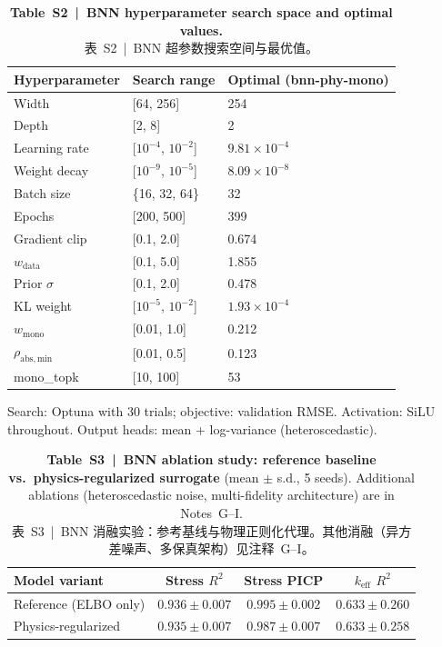 \documentclass[11pt,a4paper]{article}
\newcommand{\keff}{\ensuremath{k_{\mathrm{eff}}}}
\begin{document}
\begin{table}[htbp]
\centering
\caption{\textbf{Table~S2~|~BNN hyperparameter search space and optimal
values.}\\
\small 表~S2~|~BNN 超参数搜索空间与最优值。}
\label{tab:S2}
\smallskip
\small
\begin{tabular}{lll}
\toprule
Hyperparameter & Search range & Optimal (bnn-phy-mono) \\
\midrule
Width           & [64, 256]           & 254 \\
Depth           & [2, 8]              & 2 \\
Learning rate   & [$10^{-4}$, $10^{-2}$] & $9.81\times10^{-4}$ \\
Weight decay    & [$10^{-9}$, $10^{-5}$] & $8.09\times10^{-8}$ \\
Batch size      & \{16, 32, 64\}      & 32 \\
Epochs          & [200, 500]          & 399 \\
Gradient clip   & [0.1, 2.0]          & 0.674 \\
$w_\mathrm{data}$ & [0.1, 5.0]       & 1.855 \\
Prior $\sigma$  & [0.1, 2.0]          & 0.478 \\
KL weight       & [$10^{-5}$, $10^{-2}$] & $1.93\times10^{-4}$ \\
$w_\mathrm{mono}$ & [0.01, 1.0]      & 0.212 \\
$\rho_\mathrm{abs,min}$ & [0.01, 0.5] & 0.123 \\
mono\_topk      & [10, 100]           & 53 \\
\bottomrule
\end{tabular}

\smallskip
Search: Optuna with 30 trials; objective: validation RMSE.
Activation: SiLU throughout. Output heads: mean + log-variance
(heteroscedastic).
\end{table}

\begin{table}[htbp]
\centering
\caption{\textbf{Table~S3~|~BNN ablation study: reference baseline vs.\
physics-regularized surrogate} (mean $\pm$ s.d., 5 seeds).
Additional ablations (heteroscedastic noise, multi-fidelity architecture)
are in Notes~G--I.\\
\small 表~S3~|~BNN 消融实验：参考基线与物理正则化代理。其他消融（异方差噪声、多保真架构）见注释~G--I。}
\label{tab:S3}
\smallskip
\small
\begin{tabular}{lccc}
\toprule
Model variant & Stress $R^2$ & Stress PICP & \keff{} $R^2$ \\
\midrule
Reference (ELBO only) & $0.936\pm0.007$ & $0.995\pm0.002$ & $0.633\pm0.260$ \\
Physics-regularized   & $0.935\pm0.007$ & $0.987\pm0.007$ & $0.633\pm0.258$ \\
\bottomrule
\end{tabular}
\end{table}
\end{document}
